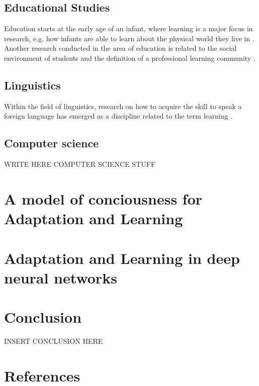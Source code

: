 \documentclass[conference]{IEEEtran}
\begin{document}
	\subsection{Educational Studies}\label{ES}
	Education starts at the early age of an infant, where learning is a major focus in research, e.g. how infants are able to learn about the physical world they live in \cite{b12}. Another research conducted in the area of education is related to the social environment of students and the definition of a professional learning community \cite{b13}.

	\subsection{Linguistics}\label{Li}
	Within the field of linguistics, research on how to acquire the skill to speak a foreign language has emerged as a discipline related to the term learning \cite{b14}.

	\subsection{Computer science}\label{CS}
	WRITE HERE COMPUTER SCIENCE STUFF


\section{A model of conciousness for Adaptation and Learning}

\section{Adaptation and Learning in deep neural networks}

\section{Conclusion}
	INSERT CONCLUSION HERE

\section*{References}
\end{document}
